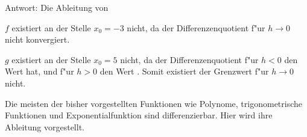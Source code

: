 \begin{MExercises}
\begin{MExercise}
Antwort:
Die Ableitung von
\begin{MExerciseItems}
\item $f$ existiert an der Stelle $x_0 = -3$ nicht, 
da der Differenzenquotient 
f"ur $h \to 0$ nicht konvergiert.
\item $g$ existiert an der Stelle $x_0 = 5$ nicht, da der 
Differenzenquotient f"ur $h < 0$ den Wert 
 hat, und f"ur $h > 0$ den 
Wert {}\!\!. Somit existiert der Grenzwert f"ur 
$h \to 0$ nicht.
\end{MExerciseItems}
\end{MExercise}


\end{MExercises}




\begin{MIntro}
Die meisten der bisher vorgestellten Funktionen wie Polynome, trigonometrische
Funktionen und Exponentialfunktion sind differenzierbar. 
Hier wird ihre Ableitung vorgestellt.
\end{MIntro}


 


